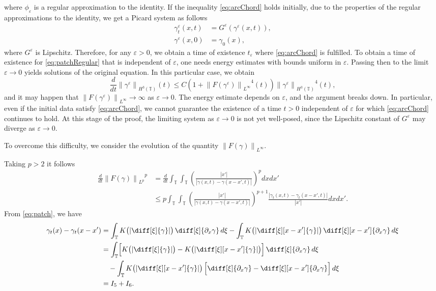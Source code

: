 \documentclass[a4paper]{amsart}
\theoremstyle{definition}
\newcommand{\T}{\ensuremath{\mathbb{T}}}
\newcommand{\Np}[2][\infty]{\ensuremath{\left\|#2\right\|_{L^#1}}}
\newcommand{\Hs}[1]{\ensuremath{\left\|#1\right\|_{H^3(\T)}}}
\begin{document}
    where $\phi_{\varepsilon}$ is a regular approximation to the identity. If the inequality \eqref{eq:arcChord}
   holds initially, due to the properties of the regular approximations to the identity, we get
    a Picard system as follows
    \begin{align*}
    \gamma^\varepsilon_t(x,t)&=G^\varepsilon(\gamma^{\varepsilon}(x,t)),\\
    \gamma^\varepsilon(x,0)&=\gamma_0(x),
    \end{align*}
    where $G^{\varepsilon}$ is Lipschitz. Therefore, for any $\varepsilon>0$, we obtain a time of existence $t_\varepsilon$
    where \eqref{eq:arcChord} is fulfilled. To obtain a time of existence for \eqref{eq:patchRegular} that is independent of $\varepsilon$, one needs energy estimates with bounds uniform in $\varepsilon$. Passing then to the limit $\varepsilon \to 0$ yields solutions of the original equation. In this particular case, we obtain
    \begin{equation*}
    \frac{d}{dt}\Hs{\gamma^\varepsilon}(t)\leq C (1+\Np{F(\gamma^\varepsilon)}^{4}(t))\Hs{\gamma^{\varepsilon} }^4(t),
    \end{equation*}
    and it may happen that $\Np{F(\gamma^\varepsilon)}\rightarrow \infty$ as $\varepsilon\to 0$. The energy estimate depends on $\varepsilon$, and the argument breaks down. In particular, even if the initial data satisfy \eqref{eq:arcChord}, we cannot guarantee the existence of a time $t>0$ independent of $\varepsilon$ for which \eqref{eq:arcChord} continues to hold. At this stage of the proof, the limiting system as $\varepsilon \to 0$ is not yet well-posed, since the Lipschitz constant of $G^\varepsilon$ may diverge as $\varepsilon \to 0$.
    
    To overcome this difficulty, we consider the evolution of the quantity $\Np{F(\gamma)}.$    
    
    Taking $p>2$ it follows 
    \begin{align*}
        \frac{d}{dt} \Np[p]{F(\gamma)}^p&= \frac{d}{dt} \int_\T\int_\T \left( \frac{|x'|}{|\gamma(x,t)-\gamma(x-x',t)|}\right)^p dxdx'\\
        &\leq p \int_\T\int_\T \left( \frac{|x'|}{|\gamma(x,t)-\gamma(x-x',t)|}\right)^{p+1}\frac{|\gamma_t(x,t)-\gamma_t(x-x',t)|}{|x'|} dxdx'.
    \end{align*}
    From \eqref{eq:patch}, we have 
    \begin{align*}
    \gamma_t(x)-\gamma_t(x-x')
    &= \int_{\T} K\bigl(|\diff[\xi]{\gamma}|\bigr)\,\diff[\xi]{\partial_x\gamma}\,d\xi 
       - \int_{\T} K\bigl(|\diff[\xi][x-x']{\gamma}|\bigr)\,\diff[\xi][x-x']{\partial_x\gamma}\,d\xi \\
    &= \int_{\T} \Bigl[K\bigl(|\diff[\xi]{\gamma}|\bigr)-K\bigl(|\diff[\xi][x-x']{\gamma}|\bigr)\Bigr]\,\diff[\xi]{\partial_x\gamma}\,d\xi \\
    &\quad - \int_{\T} K\bigl(|\diff[\xi][x-x']{\gamma}|\bigr)\,\Bigl[\diff[\xi]{\partial_x\gamma} - \diff[\xi][x-x']{\partial_x\gamma}\Bigr]\,d\xi \\
    &= I_5 + I_6.
\end{align*}
\end{document}
